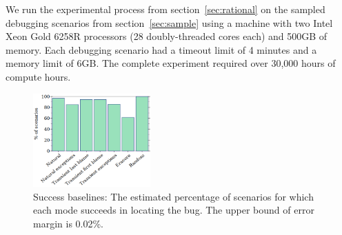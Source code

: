 
We run the experimental process from section~\ref{sec:rational} on the
sampled debugging scenarios from section~\ref{sec:sample} using a machine with two Intel Xeon Gold 6258R processors (28 doubly-threaded cores each) and 500GB of memory.
Each debugging scenario had a timeout limit of 4 minutes and a
memory limit of 6GB. The complete experiment required
over 30,000 hours of compute hours.


\begin{figure}
  \centering
  \includegraphics[width=0.40\textwidth]{./plots/success-bars}
  \caption{Success baselines: The estimated percentage of scenarios for which each mode succeeds in locating the bug.
  The upper bound of error margin is 0.02\%.
  }
  \label{fig:success-bars}
\end{figure}

